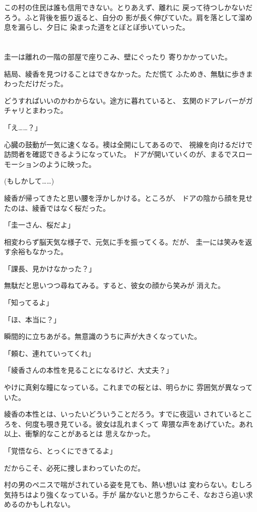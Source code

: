 ﻿\documentclass[
    book,tate,
    line_length=30zw,
    jafontsize=12pt,
    paper=b5j,
    landscape,
    ]{jlreq}
\begin{document}
この村の住民は誰も信用できない。とりあえず、離れに
戻って待つしかないだろう。ふと背後を振り返ると、自分の
影が長く伸びていた。肩を落として溜め息を漏らし、夕日に
染まった道をとぼとぼ歩いていった。

\section*{}

圭一は離れの一階の部屋で座りこみ、壁にぐったり
寄りかかっていた。

結局、綾香を見つけることはできなかった。ただ慌て
ふためき、無駄に歩きまわっただけだった。 

どうすればいいのかわからない。途方に暮れていると、
玄関のドアレバーがガチャリとまわった。

「え……？」

心臓の鼓動が一気に速くなる。襖は全開にしてあるので、
視線を向けるだけで訪問者を確認できるようになっていた。
ドアが開いていくのが、まるでスローモーションのように映った。

(もしかして……)

綾香が帰ってきたと思い腰を浮かしかける。ところが、
ドアの陰から顔を見せたのは、綾香ではなく桜だった。

「圭一さん、桜だよ」

相変わらず脳天気な様子で、元気に手を振ってくる。だが、
圭一には笑みを返す余裕もなかった。

「課長、見かけなかった？」

無駄だと思いつつ尋ねてみる。すると、彼女の顔から笑みが
消えた。

「知ってるよ」

「ほ、本当に？」

瞬間的に立ちあがる。無意識のうちに声が大きくなっていた。

「頼む、連れていってくれ」

「綾香さんの本性を見ることになるけど、大丈夫？」

やけに真剣な瞳になっている。これまでの桜とは、明らかに
雰囲気が異なっていた。

綾香の本性とは、いったいどういうことだろう。すでに夜這い
されているところを、何度も覗き見ている。彼女は乱れまくって
卑猥な声をあげていた。あれ以上、衝撃的なことがあるとは
思えなかった。

「覚悟なら、とっくにできてるよ」

だからこそ、必死に捜しまわっていたのだ。

村の男のペニスで喘がされている姿を見ても、熱い想いは
変わらない。むしろ気持ちはより強くなっている。手が
届かないと思うからこそ、なおさら追い求めるのかもしれない。
\end{document}
